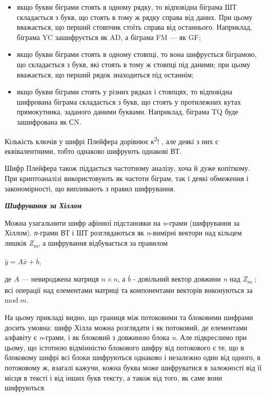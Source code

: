 \liststyleWWviiiNumxxx
\begin{itemize}
\item якщо букви біграми стоять в одному рядку, то відповідна біграма ШТ
складається з букв, що стоять в тому ж рядку справа від даних. При цьому
вважається, що перший стовпчик стоїть справа від останнього. Наприклад, біграма
YC зашифрується як AD, а біграма FM --- як GF;
\item якщо букви біграми стоять в одному стовпці, то вона шифрується біграмою,
що складається з букв, які стоять в тому ж стовпці під даними; при цьому
вважається, що перший рядок знаходиться під останнім;
\item якщо букви біграми стоять у різних рядках і стовпцях, то відповідна
шифрована біграма складається з букв, що стоять у протилежних кутах
прямокутника, заданого даними буквами. Наприклад, біграма TQ буде зашифрована
як СN.
\end{itemize}
Кількість ключів у шифрі Плейфера дорівнює \textit{к}\textsuperscript{2}!  , але
деякі з них є еквівалентними, тобто однаково шифрують однакові ВТ.

Шифр Плейфера також піддається частотному аналізу, хоча й дуже копіткому. При
криптоаналізі використовують як частоти біграм, так і деякі обмеження і
закономірності, що випливають з правил шифрування.


\bigskip


\bigskip

{\centering\bfseries\itshape
Шифрування за Хіллом
\par}


\bigskip


\bigskip

Можна узагальнити шифр афінної підстановки на \textit{n}{}-грами (шифрування за
Хіллом). \textit{п}{}-грами ВТ і ШТ розглядаються як \textit{n}{}-вимірні
вектори над кільцем лишків \textit{Z}\textit{\textsubscript{m}}, а шифрування
відбувається за правилом

{\centering
 ${\bar{{y}}=A\bar{{x}}+\overline{{b}}}$,
\par}

де  ${A}$ --- невироджена матриця   ${n\times n}$, а  ${\overline{{b}}}$ -
довільний вектор довжини \textit{n} над
\textit{Z}\textit{\textsubscript{m}}\textsubscript{ }; всі операції над
елементами матриці та компонентами векторів виконуються за  ${\text{mod}\;m}$.

На цьому прикладі видно, що границя між потоковими та блоковими шифрами досить
умовна: шифр Хілла можна розглядати і як потоковий, де елементами алфавіту є
\textit{n}{}-грами, і як блоковий з довжиною блока \textit{n}. Але підкреслимо
при цьому, що істотною відмінністю блокового шифру від потокового є те, що в
блоковому шифрі всі блоки шифруються однаково і незалежно один від одного, в
потоковому ж, взагалі кажучи, кожна буква може шифруватися в залежності від її
місця в тексті і від інших букв тексту, а також від того, як саме вони
шифруються.


